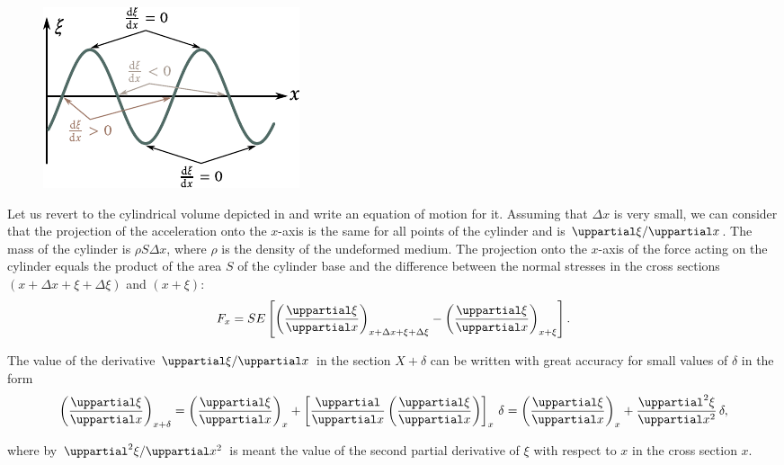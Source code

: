 \begin{figure}[t]
	\begin{center}
		\includegraphics[scale=1.1]{figures/ch_14/fig_14_7.pdf}
		\caption[]{}
		\label{fig:14_7}
	\end{center}
	\vspace{-0.8cm}
\end{figure}

Let us revert to the cylindrical volume depicted in  and write an equation of motion for it.
Assuming that $\Delta{x}$ is very small, we can consider that the projection of the acceleration onto
the $x$-axis is the same for all points of the cylinder and is $\diffpartialin{\xi}{x}$.
The mass of the cylinder is $\rho S\Delta{x}$, where $\rho$ is the density of the undeformed medium.
The projection onto the $x$-axis of the force acting on the cylinder equals the product of the area $S$ of the cylinder base and the difference between the normal stresses in the cross sections $(x+\Delta{x} +\xi + \Delta{\xi})$ and $(x+\xi)$:
\begin{equation}\label{eq:14_32}
	F_x = SE \bracket{ \parenthesis{ \diffpartial{\xi}{x} }_{x + \Delta{x} +\xi + \Delta{\xi}} - \parenthesis{ \diffpartial{\xi}{x} }_{x + \xi} }.
\end{equation}

The value of the derivative $\diffpartialin{\xi}{x}$ in the section $X + \delta$ can be written with great accuracy for small values of $\delta$ in the form
\begin{equation}\label{eq:14_33}
	\parenthesis{ \diffpartial{\xi}{x} }_{x+\delta} = \parenthesis{ \diffpartial{\xi}{x} }_{x} + \bracket{ \diffpartial{}{x} \parenthesis{ \diffpartial{\xi}{x} } }_x\, \delta = \parenthesis{ \diffpartial{\xi}{x} }_{x} + \diffnpartial{\xi}{x}{2}\, \delta,
\end{equation}

\noindent
where by $\diffnpartialin{\xi}{x}{2}$ is meant the value of the second partial derivative of $\xi$ with respect to $x$ in the cross section $x$.

